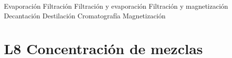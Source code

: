 \documentclass[12pt,addpoints]{evalua}
\begin{document}
\begin{questions}
{\begin{multicols}{2}
               \columnbreak

               \begin{choices}
                  \choice Evaporación
                    \choice Filtración
                    \choice Filtración y evaporación
                    \choice Filtración y magnetización
                    \choice Decantación
                    \choice Destilación
                    \choice Cromatografía
                    \choice Magnetización
               \end{choices}
          \end{multicols}
     }

	\section*{L8 Concentración de mezclas}

\end{questions}
\end{document}
